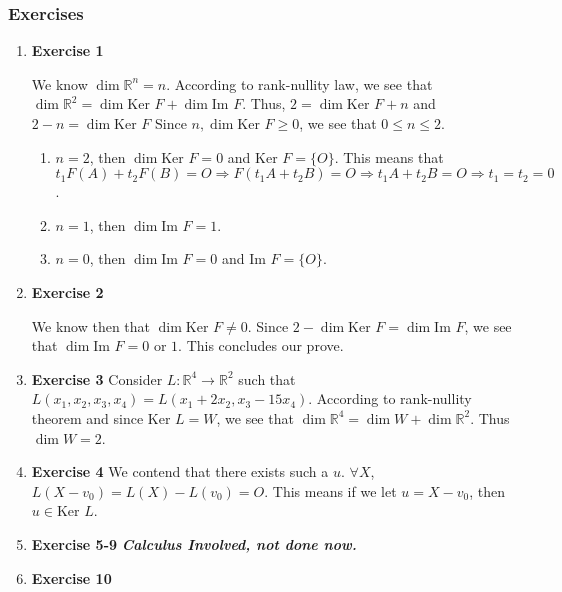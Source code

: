 \documentclass[11pt]{article}
\begin{document}
\subsubsection{Exercises}
\label{sec:orgaeffbd5}
\begin{enumerate}
\item \textbf{Exercise 1}
\label{sec:org17ddacf}

We know \(\dim \mathbb{R}^{n}=n\). According to rank-nullity law, we see that \(\dim \mathbb{R}^2=\dim \text{Ker }F+\dim \text{Im }F\). Thus, \(2=\dim \text{Ker }F+n\) and \(2-n=\dim \text{Ker }F\) Since \(n,\dim \text{Ker }F\geq 0\), we see that \(0\leq n\leq 2\).
\begin{enumerate}
\item \(n=2\), then \(\dim \text{Ker }F=0\) and \(\text{Ker }F=\{O\}\). This means that \(t_1F(A)+t_2F(B)=O \Rightarrow F(t_1A+t_2B)=O \Rightarrow t_1A+t_2B=O \Rightarrow t_1=t_2=0\).
\item \(n=1\), then \(\dim \text{Im }F=1\).
\item \(n=0\), then \(\dim \text{Im }F=0\) and \(\text{Im }F=\{O\}\).
\end{enumerate}
\item \textbf{Exercise 2}
\label{sec:orgf34f63c}

We know then that \(\dim \text{Ker }F\not =0\). Since \(2-\dim \text{Ker } F=\dim \text{Im }F\), we see that \(\dim \text{Im }F=0\) or \(1\). This concludes our prove.
\item \textbf{Exercise 3}
\label{sec:org50251f0}
Consider \(L:\mathbb{R}^4\rightarrow \mathbb{R}^2\) such that \(L(x_1,x_2,x_3,x_4)=L(x_1+2x_2,x_3-15x_4)\). According to rank-nullity theorem and since \(\text{Ker }L=W\), we see that \(\dim \mathbb{R}^4=\dim W+\dim \mathbb{R}^{2}\). Thus \(\dim W=2\).
\item \textbf{Exercise 4}
\label{sec:orgf12cb63}
We contend that there exists such a \(u\). \(\forall X\), \(L(X-v_0)=L(X)-L(v_0)=O\). This means if we let \(u=X-v_0\), then \(u\in \text{Ker }L\).
\item \textbf{Exercise 5-9}
\label{sec:org7ace46b}
\emph{\textbf{Calculus Involved, not done now.}}
\item \textbf{Exercise 10}
\label{sec:org5b766b5}


\end{enumerate}
\end{document}
